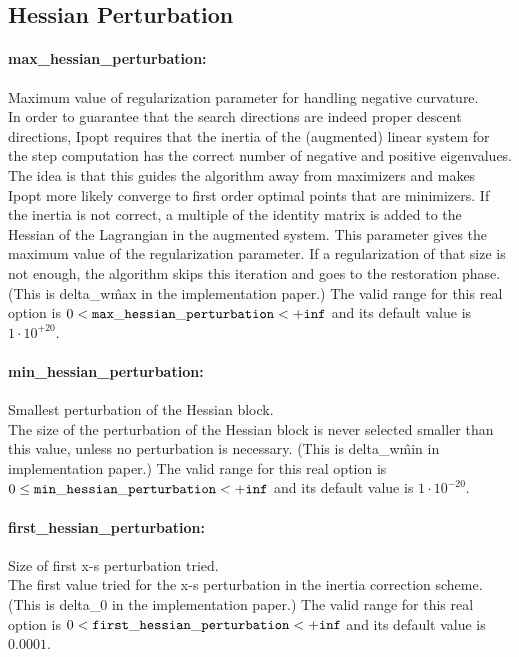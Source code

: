 \subsection{Hessian Perturbation}

\paragraph{max\_hessian\_perturbation:}\label{opt:max_hessian_perturbation} Maximum value of regularization parameter for handling negative curvature. \\
 In order to guarantee that the search directions
are indeed proper descent directions, Ipopt
requires that the inertia of the (augmented)
linear system for the step computation has the
correct number of negative and positive
eigenvalues. The idea is that this guides the
algorithm away from maximizers and makes Ipopt
more likely converge to first order optimal
points that are minimizers. If the inertia is not
correct, a multiple of the identity matrix is
added to the Hessian of the Lagrangian in the
augmented system. This parameter gives the
maximum value of the regularization parameter. If
a regularization of that size is not enough, the
algorithm skips this iteration and goes to the
restoration phase. (This is delta\_w\^max in the
implementation paper.) The valid range for this real option is 
$0 <  {\tt max\_hessian\_perturbation } <  {\tt +inf}$
and its default value is $1 \cdot 10^{+20}$.


\paragraph{min\_hessian\_perturbation:}\label{opt:min_hessian_perturbation} Smallest perturbation of the Hessian block. \\
 The size of the perturbation of the Hessian block
is never selected smaller than this value, unless
no perturbation is necessary. (This is
delta\_w\^min in implementation paper.) The valid range for this real option is 
$0 \le {\tt min\_hessian\_perturbation } <  {\tt +inf}$
and its default value is $1 \cdot 10^{-20}$.


\paragraph{first\_hessian\_perturbation:}\label{opt:first_hessian_perturbation} Size of first x-s perturbation tried. \\
 The first value tried for the x-s perturbation in
the inertia correction scheme.(This is delta\_0
in the implementation paper.) The valid range for this real option is 
$0 <  {\tt first\_hessian\_perturbation } <  {\tt +inf}$
and its default value is $0.0001$.


